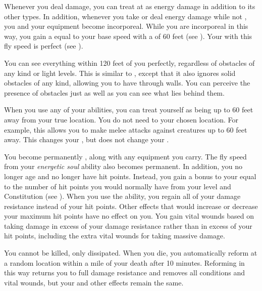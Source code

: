              Whenever you deal damage, you can treat at as energy damage in addition to its other types.
            In addition, whenever you take or deal energy damage while not , you and your equipment  become incorporeal.
            While you are incorporeal in this way, you gain a  equal to your base speed with a  of 60 feet (see ).
            Your  with this fly speed is perfect (see ).

             You can see everything within 120 feet of you perfectly, regardless of obstacles of any kind or light levels.
            This is similar to , except that it also ignores solid obstacles of any kind, allowing you to have  through walls.
            You can perceive the presence of obstacles just as well as you can see what lies behind them.

             When you use any of your abilities, you can treat yourself as being up to 60 feet away from your true location.
            You do not need  to your chosen location.
            For example, this allows you to make melee attacks against creatures up to 60 feet away.
            This changes your , but does not change your .

             You become permanently , along with any equipment you carry.
            The fly speed from your \textit{energetic soul} ability also becomes permanent.
            In addition, you no longer age and no longer have hit points.
            Instead, you gain a bonus to your  equal to the number of hit points you would normally have from your level and Constitution (see ).
            When you use the  ability, you regain all of your damage resistance instead of your hit points.
            Other effects that would increase or decrease your maximum hit points have no effect on you.
            You gain vital wounds based on taking damage in excess of your damage resistance rather than in excess of your hit points, including the extra vital wounds for taking massive damage.

             You cannot be killed, only dissipated.
            When you die, you automatically reform at a random location within a mile of your death after 10 minutes.
            Reforming in this way returns you to full damage resistance and removes all conditions and vital wounds, but your  and other effects remain the same.

